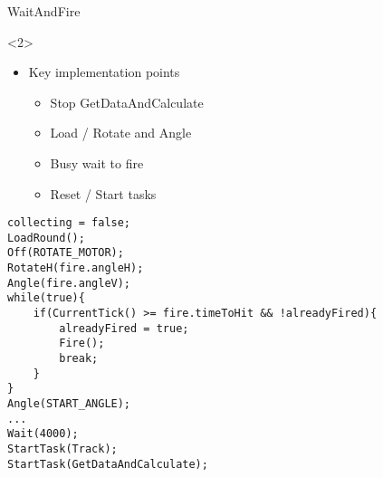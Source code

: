 \begin{frame}[fragile]{WaitAndFire}
\begin{onlyenv}<2>
\begin{itemize}
  \item Key implementation points
  	\begin{itemize}
  		\item Stop GetDataAndCalculate
  		\item Load / Rotate and Angle
  		\item Busy wait to fire
  		\item Reset / Start tasks 
	\end{itemize}
\end{itemize}
\begin{center}
\begin{minipage}[H]{0.9\linewidth}
\begin{lstlisting}
collecting = false;
LoadRound();
Off(ROTATE_MOTOR);
RotateH(fire.angleH);
Angle(fire.angleV);
while(true){
	if(CurrentTick() >= fire.timeToHit && !alreadyFired){
    	alreadyFired = true;
        Fire();
        break;
    }
}
Angle(START_ANGLE);
...
Wait(4000);
StartTask(Track);
StartTask(GetDataAndCalculate);
\end{lstlisting} 
\end{minipage}
\end{center}
\end{onlyenv}
\end{frame}